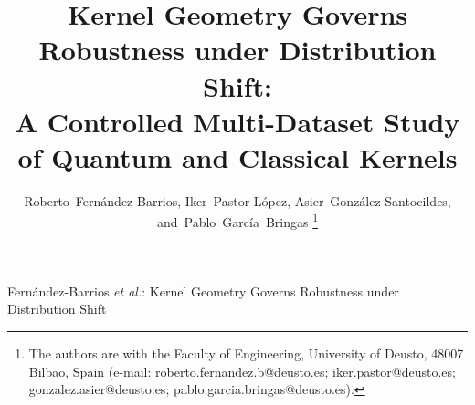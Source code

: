 \documentclass[journal]{IEEEtran}
\begin{document}
\title{Kernel Geometry Governs Robustness under Distribution Shift:\\
A Controlled Multi-Dataset Study of Quantum and Classical Kernels}

\author{Roberto~Fern\'andez-Barrios,
        Iker~Pastor-L\'opez,
        Asier~Gonz\'alez-Santocildes,
        and~Pablo~Garc\'ia~Bringas%
\thanks{The authors are with the Faculty of Engineering, University of Deusto,
48007 Bilbao, Spain (e-mail: roberto.fernandez.b@deusto.es;
iker.pastor@deusto.es; gonzalez.asier@deusto.es;
pablo.garcia.bringas@deusto.es).}}

%
{Fern\'andez-Barrios \MakeLowercase{\textit{et al.}}: Kernel Geometry Governs Robustness under Distribution Shift}

\maketitle
\end{document}
